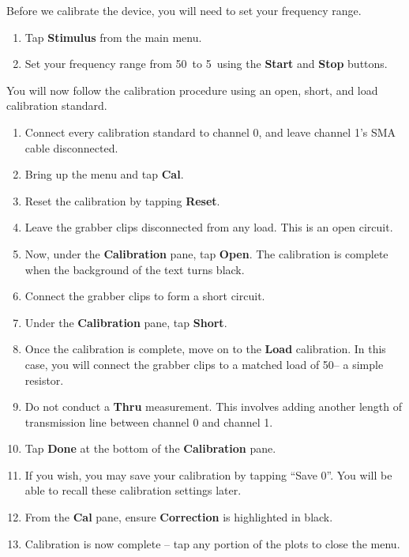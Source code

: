 \documentclass{exam}
\begin{document}
Before we calibrate the device, you will need to set your frequency range.

\begin{enumerate}

	\item Tap \textbf{Stimulus} from the main menu.

	\item Set your frequency range from 50\khz\ to 5\mhz\ using the \textbf{Start} and \textbf{Stop} buttons.

\end{enumerate}

You will now follow the calibration procedure using an open, short, and load calibration standard.

\begin{enumerate}

	\item Connect every calibration standard to channel 0, and leave channel 1's SMA cable disconnected.

	\item Bring up the menu and tap \textbf{Cal}.

	\item Reset the calibration by tapping \textbf{Reset}.

	\item Leave the grabber clips disconnected from any load. This is an open circuit.

	\item Now, under the \textbf{Calibration} pane, tap \textbf{Open}. The calibration is complete when the background of the text turns black.

	\item Connect the grabber clips to form a short circuit.

	\item Under the \textbf{Calibration} pane, tap \textbf{Short}.

	\item Once the calibration is complete, move on to the \textbf{Load} calibration. In this case, you will connect the grabber clips to a matched load of 50\ohms -- a simple resistor.

	\item Do not conduct a \textbf{Thru} measurement. This involves adding another length of transmission line between channel 0 and channel 1.

	\item Tap \textbf{Done} at the bottom of the \textbf{Calibration} pane.

	\item If you wish, you may save your calibration by tapping ``Save 0''. You will be able to recall these calibration settings later.

	\item From the \textbf{Cal} pane, ensure \textbf{Correction} is highlighted in black.

	\item Calibration is now complete -- tap any portion of the plots to close the menu.

\end{enumerate}
\end{document}
